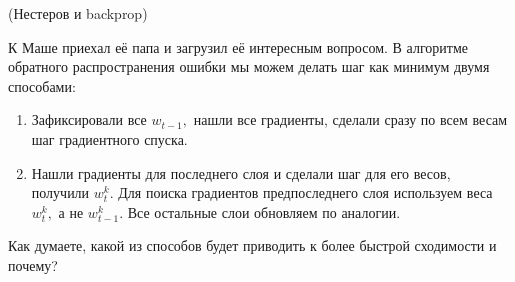 \begin{problem}{(Нестеров и backprop)}

    
    К Маше приехал её папа и загрузил её интересным вопросом. В алгоритме обратного распространения ошибки мы можем делать шаг как минимум двумя способами: 
    
    \begin{enumerate} 
        \item Зафиксировали все $w_{t-1},$ нашли все градиенты, сделали сразу по всем весам шаг градиентного спуска.
        
        \item Нашли градиенты для последнего слоя и сделали шаг для его весов, получили $w_t^k.$ Для поиска градиентов предпоследнего слоя используем веса  $w_t^k,$ а не $w_{t-1}^k.$ Все остальные слои обновляем по аналогии. 
    \end{enumerate} 
    
    Как думаете, какой из способов будет приводить к более быстрой сходимости и почему? 
\end{problem} 










	
	
	
	
	
		
